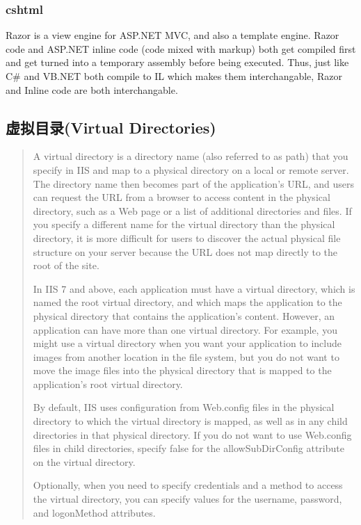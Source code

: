\documentclass{book}
\begin{document}
\subsubsection{cshtml}

Razor is a view engine for ASP.NET MVC, 
and also a template engine. Razor code and ASP.NET
 inline code (code mixed with markup) both get compiled 
 first and get turned into a temporary assembly before 
 being executed. Thus, just like C\# and VB.NET both compile to 
 IL which makes them interchangable, 
 Razor and Inline code are both interchangable. 

\subsection{虚拟目录(Virtual Directories)}

\begin{quotation}
A virtual directory is a directory name (also referred to as path) that you specify in IIS and map to a physical directory on a local or remote server. The directory name then becomes part of the application's URL, and users can request the URL from a browser to access content in the physical directory, such as a Web page or a list of additional directories and files. If you specify a different name for the virtual directory than the physical directory, it is more difficult for users to discover the actual physical file structure on your server because the URL does not map directly to the root of the site.

In IIS 7 and above, each application must have a virtual directory, which is named the root virtual directory, and which maps the application to the physical directory that contains the application's content. However, an application can have more than one virtual directory. For example, you might use a virtual directory when you want your application to include images from another location in the file system, but you do not want to move the image files into the physical directory that is mapped to the application's root virtual directory.

By default, IIS uses configuration from Web.config files in the physical directory to which the virtual directory is mapped, as well as in any child directories in that physical directory. If you do not want to use Web.config files in child directories, specify false for the allowSubDirConfig attribute on the virtual directory.

Optionally, when you need to specify credentials and a method to access the virtual directory, you can specify values for the username, password, and logonMethod attributes. 
\end{quotation}
\end{document}
